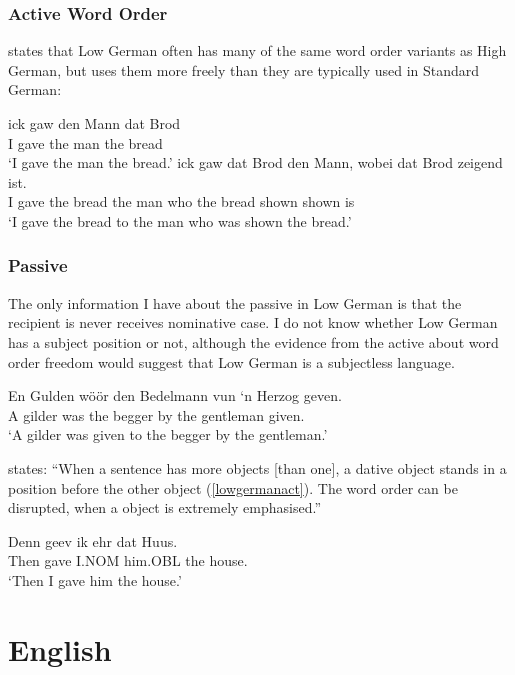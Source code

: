 \subsection{Active Word Order}
\cite{Mussaus.1829} states that Low German often has many of the same word order variants as High German, but uses them more freely than they are typically used in Standard German:
\begin{exe}
\ex
\begin{xlist}
\ex \gll ick gaw den Mann dat Brod\\
I gave the man the bread\\
\trans `I gave the man the bread.'
\ex \gll ick gaw dat Brod den Mann, wobei dat Brod zeigend ist.\\
I gave the bread the man who the bread shown shown is\\
\trans `I gave the bread to the man who was shown the bread.'
\end{xlist}
\end{exe}
\subsection{Passive}
The only information I have about the passive in Low German is that the recipient is never receives nominative case. I do not know whether Low German has a subject position or not, although the evidence from the active about word order freedom would suggest that Low German is a subjectless language.
\begin{exe}
\ex \gll En Gulden w\"o\"or den Bedelmann vun `n Herzog geven.\\
A gilder was the begger by the gentleman given.\\
\trans `A gilder was given to the begger by the gentleman.'
\end{exe}
\cite[4.3.1.3.2]{Lindow.1998} states: ``When a sentence has more objects [than one], a dative object stands in a position before the other object (\ref{lowgermanact}). The word order can be disrupted, when a object is extremely emphasised.''
\begin{exe}
\ex \label{lowgermanact}\gll Denn geev ik ehr dat Huus.\\
Then gave I.NOM him.OBL the house.\\
\trans `Then I gave him the house.'
\end{exe}
 
\chapter{English}\label{sec:English}


